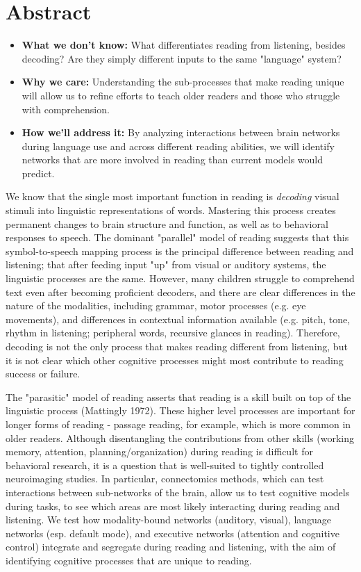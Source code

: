 \chapter{Abstract}

\begin{itemize}
	\item \textbf{What we don't know:} What differentiates reading from listening, besides decoding? Are they simply different inputs to the same "language" system?
	\item \textbf{Why we care:} Understanding the sub-processes that make reading unique will allow us to refine efforts to teach older readers and those who struggle with comprehension.
	\item \textbf{How we'll address it:} By analyzing interactions between brain networks during language use and across different reading abilities, we will identify networks that are more involved in reading than current models would predict. 
\end{itemize}

We know that the single most important function in reading is \textit{decoding} visual stimuli into linguistic representations of words. Mastering this process creates permanent changes to brain structure and function, as well as to behavioral responses to speech. The dominant "parallel" model of reading suggests that this symbol-to-speech mapping process is the principal difference between reading and listening; that after feeding input "up" from visual or auditory systems, the linguistic processes are the same. However, many children struggle to comprehend text even after becoming proficient decoders, and there are clear differences in the nature of the modalities, including grammar, motor processes (e.g. eye movements), and differences in contextual information available (e.g. pitch, tone, rhythm in listening; peripheral words, recursive glances in reading). Therefore, decoding is not the only process that makes reading different from listening, but it is not clear which other cognitive processes might most contribute to reading success or failure. 

The "parasitic" model of reading asserts that reading is a skill built on top of the linguistic process (Mattingly 1972). These higher level processes are important for longer forms of reading - passage reading, for example, which is more common in older readers. Although disentangling the contributions from other skills (working memory, attention, planning/organization) during reading is difficult for behavioral research, it is a question that is well-suited to tightly controlled neuroimaging studies. In particular, connectomics methods, which can test interactions between sub-networks of the brain, allow us to test cognitive models during tasks, to see which areas are most likely interacting during reading and listening. We test how modality-bound networks (auditory, visual), language networks (esp. default mode), and executive networks (attention and cognitive control) integrate and segregate during reading and listening, with the aim of identifying cognitive processes that are unique to reading.

